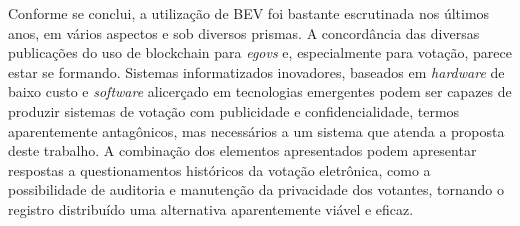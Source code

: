 Conforme se conclui, a utilização de BEV foi bastante escrutinada nos últimos anos, em vários aspectos e sob diversos prismas. A concordância das diversas publicações do uso de blockchain para \textit{\gls{egovs}} e, especialmente para votação, parece estar se formando. Sistemas informatizados inovadores, baseados em \textit{hardware} de baixo custo e \textit{software} alicerçado em tecnologias emergentes podem ser capazes de produzir sistemas de votação com publicidade e confidencialidade, termos aparentemente antagônicos, mas necessários a um sistema que atenda a proposta deste trabalho. A combinação dos elementos apresentados podem apresentar respostas a questionamentos históricos da votação eletrônica, como a possibilidade de auditoria e manutenção da privacidade dos votantes, tornando o registro distribuído uma alternativa aparentemente viável e eficaz.  